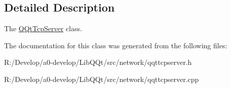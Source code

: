 \subsection{Detailed Description}
The \mbox{\hyperlink{class_q_qt_tcp_server}{Q\+Qt\+Tcp\+Server}} class. 

The documentation for this class was generated from the following files\+:\begin{DoxyCompactItemize}
\item 
R\+:/\+Develop/a0-\/develop/\+Lib\+Q\+Qt/src/network/qqttcpserver.\+h\item 
R\+:/\+Develop/a0-\/develop/\+Lib\+Q\+Qt/src/network/qqttcpserver.\+cpp\end{DoxyCompactItemize}
